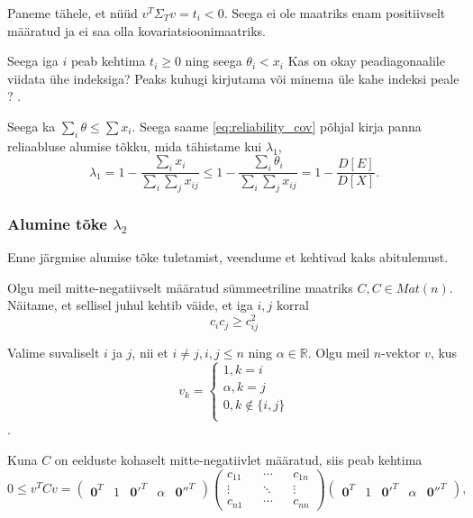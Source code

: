 \documentclass[a4paper,12pt]{article}
\numberwithin{equation}{section}
\theoremstyle{definition}
\begin{document}
Paneme tähele, et n\"u\"ud $v^T \Sigma_T v = t_i < 0$. Seega ei ole maatriks enam positiivselt määratud ja ei saa olla kovariatsioonimaatriks.

Seega iga $i$ peab kehtima $t_i \geq 0$ ning seega $\theta_i < x_i$ {\color{cyan}Kas on okay peadiagonaalile viidata \"uhe indeksiga? Peaks kuhugi kirjutama või minema \"ule kahe indeksi peale ? }.

Seega ka $\sum \nolimits_i \theta \leq \sum \nolimits x_i$. Seega saame \ref{eq:reliability_cov} põhjal kirja panna reliaabluse alumise tõkku, mida tähistame kui $\lambda_1$,
\begin{equation}
\lambda_1 = 1 - \frac{\sum_i x_i}{\sum_i \sum_j x_{ij}} \leq  1 - \frac{\sum_i \theta_i}{\sum_i \sum_j x_{ij}} =  1 - \frac{D \left[ E \right]}{D \left[ X \right]}.
\end{equation} 

\subsubsection{Alumine tõke $\lambda_2$}

Enne järgmise alumise tõke tuletamist, veendume et kehtivad kaks abitulemust.

Olgu meil mitte-negatiivselt määratud s\"ummeetriline maatriks $C, C \in Mat(n)$. Näitame, et sellisel juhul kehtib väide, et iga $i,j$ korral
\begin{equation*}
c_{i}c_{j} \geq c_{ij}^2 
\end{equation*}

Valime suvaliselt $i$ ja $j$, nii et $i \neq j, i,j \leq n$ ning $\alpha \in \mathbb{R}$. Olgu meil $n$-vektor $v$, kus
\begin{equation*}
v_k =
\begin{cases}
1, k=i \\
\alpha, k=j \\
0, k \not \in \lbrace i, j \rbrace \\
\end{cases}
\end{equation*}.

Kuna $C$ on eelduste kohaselt mitte-negatiivlet määratud, siis peab kehtima 
\begin{equation}
\label{eq:sd-toestus-maatriks-korrutis}
0 \leq v^{T}Cv = 
\begin{pmatrix}
\mathbf{0}^T & 1 & \mathbf{0'}^T & \alpha & \mathbf{0''}^T
\end{pmatrix}
\begin{pmatrix}
c_{11} && \cdots && c_{1n} \\
\vdots && \ddots && \vdots \\
c_{n1} && \cdots && c_{nn}  
\end{pmatrix}
\begin{pmatrix}
\mathbf{0}^T & 1 & \mathbf{0'}^T & \alpha & \mathbf{0''}^T
\end{pmatrix},
\end{equation}
\end{document}
